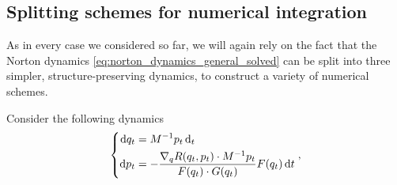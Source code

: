 \subsection{Splitting schemes for numerical integration}
As in every case we considered so far, we will again rely on the fact that the Norton dynamics \eqref{eq:norton_dynamics_general_solved} can be split into three simpler, structure-preserving dynamics, to construct a variety of numerical schemes.
\begin{definition}
    Consider the following dynamics
    \begin{equation}
        \label{eq:norton_A_dynamics}
        \left\{
            \begin{aligned}
                \mathrm{d} q_t &=M^{-1}p_t\,\mathrm{d}_t\\
                \mathrm{d} p_t &= -\frac{\nabla_q R(q_t,p_t)\cdot M^{-1}p_t}{F(q_t)\cdot G(q_t)}F(q_t)\,\mathrm{d} t
            \end{aligned}
        \right.,
    \end{equation}


\end{definition}
